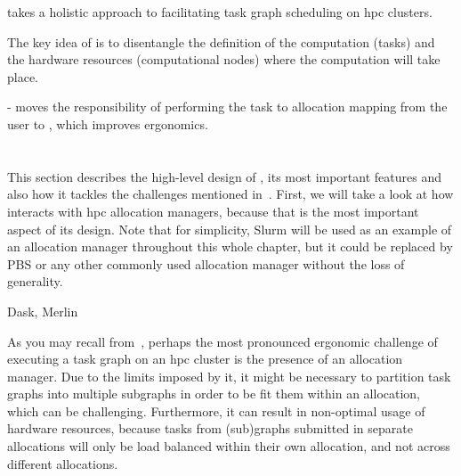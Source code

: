 \hyperqueue{} takes a holistic approach to facilitating task graph scheduling on
\gls{hpc} clusters.



The key idea of \hyperqueue{} is to disentangle the definition of the computation (tasks)
and the hardware resources (computational nodes) where the computation will take place.

- moves the responsibility of performing the task to allocation mapping from the user to
\hyperqueue{},
which improves ergonomics.
















\section{\hyperqueue{}}


\label{sec:hq-design}
This section describes the high-level design of \hyperqueue{}, its most important features
and also how it tackles the challenges mentioned in~. First, we will take a
look at how \hyperqueue{} interacts with \gls{hpc} allocation managers,
because that is the most important aspect of its design. Note that for simplicity, Slurm will be
used as an example of an allocation manager throughout this whole chapter, but it could be replaced
by PBS or any other commonly used allocation manager without the loss of generality.

Dask, Merlin

As you may recall from~, perhaps the most pronounced ergonomic challenge of
executing a task graph on an \gls{hpc} cluster is the presence of an allocation
manager. Due to the limits imposed by it, it might be necessary to partition task graphs into
multiple subgraphs in order to be fit them within an allocation, which can be challenging.
Furthermore, it can result in non-optimal usage of hardware resources, because tasks from
(sub)graphs submitted in separate allocations will only be load balanced within their own
allocation, and not across different allocations.

